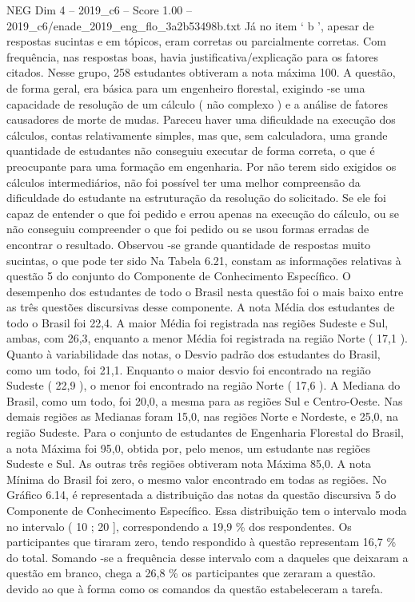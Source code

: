 \begin{textsample}{NEG Dim 4 – 2019\_c6 – Score 1.00 – 2019\_c6/enade\_2019\_eng\_flo\_3a2b53498b.txt}
Já no item ‘ b ’, apesar de respostas sucintas e em tópicos, eram corretas ou parcialmente corretas.
Com frequência, nas respostas boas, havia justificativa/explicação para os fatores citados.
Nesse grupo, 258 estudantes obtiveram a nota máxima 100.
A questão, de forma geral, era básica para um engenheiro florestal, exigindo -se uma capacidade de resolução de um cálculo ( não complexo ) e a análise de fatores causadores de morte de mudas.
Pareceu haver uma dificuldade na execução dos cálculos, contas relativamente simples, mas que, sem calculadora, uma grande quantidade de estudantes não conseguiu executar de forma correta, o que é preocupante para uma formação em engenharia.
Por não terem sido exigidos os cálculos intermediários, não foi possível ter uma melhor compreensão da dificuldade do estudante na estruturação da resolução do solicitado.
Se ele foi capaz de entender o que foi pedido e errou apenas na execução do cálculo, ou se não conseguiu compreender o que foi pedido ou se usou formas erradas de encontrar o resultado.
Observou -se grande quantidade de respostas muito sucintas, o que pode ter sido Na Tabela 6.21, constam as informações relativas à questão 5 do conjunto do Componente de Conhecimento Específico.
O desempenho dos estudantes de todo o Brasil nesta questão foi o mais baixo entre as três questões discursivas desse componente.
A nota Média dos estudantes de todo o Brasil foi 22,4.
A maior Média foi registrada nas regiões Sudeste e Sul, ambas, com 26,3, enquanto a menor Média foi registrada na região Norte ( 17,1 ).
Quanto à variabilidade das notas, o Desvio padrão dos estudantes do Brasil, como um todo, foi 21,1.
Enquanto o maior desvio foi encontrado na região Sudeste ( 22,9 ), o menor foi encontrado na região Norte ( 17,6 ).
A Mediana do Brasil, como um todo, foi 20,0, a mesma para as regiões Sul e Centro-Oeste.
Nas demais regiões as Medianas foram 15,0, nas regiões Norte e Nordeste, e 25,0, na região Sudeste.
Para o conjunto de estudantes de Engenharia Florestal do Brasil, a nota Máxima foi 95,0, obtida por, pelo menos, um estudante nas regiões Sudeste e Sul.
As outras três regiões obtiveram nota Máxima 85,0.
A nota Mínima do Brasil foi zero, o mesmo valor encontrado em todas as regiões.
No Gráfico 6.14, é representada a distribuição das notas da questão discursiva 5 do Componente de Conhecimento Específico.
Essa distribuição tem o intervalo moda no intervalo ( 10 ; 20 ], correspondendo a 19,9 \% dos respondentes.
Os participantes que tiraram zero, tendo respondido à questão representam 16,7 \% do total.
Somando -se a frequência desse intervalo com a daqueles que deixaram a questão em branco, chega a 26,8 \% os participantes que zeraram a questão. devido ao que à forma como os comandos da questão estabeleceram a tarefa.

\end{textsample}
